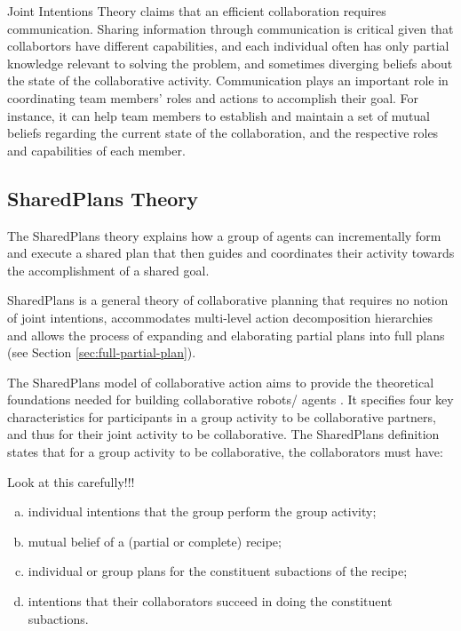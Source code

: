 \documentclass[11pt]{article}
\begin{document}
Joint Intentions Theory claims that an efficient collaboration requires
communication. Sharing information through communication is critical given that
collabortors have different capabilities, and each individual often has only
partial knowledge relevant to solving the problem, and sometimes diverging
beliefs about the state of the collaborative activity. Communication plays an
important role in coordinating team members' roles and actions to accomplish
their goal. For instance, it can help team members to establish and maintain a
set of mutual beliefs regarding the current state of the collaboration, and the
respective roles and capabilities of each member.

\subsection{SharedPlans Theory}
\label{sec:sharedplans}

The SharedPlans theory explains how a group of agents can incrementally form and
execute a shared plan that then guides and coordinates their activity towards
the accomplishment of a shared goal.

SharedPlans is a general theory of collaborative planning that requires no
notion of joint intentions, accommodates multi-level action decomposition
hierarchies and allows the process of expanding and elaborating partial plans
into full plans (see Section \ref{sec:full-partial-plan}).

The SharedPlans model of collaborative action \cite{grosz:planning-acting}
\cite{grosz:collaboration} \cite{grosz:plans-discourse} aims to provide the
theoretical foundations needed for building collaborative robots/ agents
\cite{grosz:collaborative-systems}. It specifies four key characteristics for
participants in a group activity to be collaborative partners, and thus for
their joint activity to be collaborative. The SharedPlans definition states that
for a group activity to be collaborative, the collaborators must have:

Look at this carefully!!!

\begin{enumerate}[a)]
  \item individual intentions that the group perform the group activity;
  \item mutual belief of a (partial or complete) recipe;
  \item individual or group plans for the constituent subactions of the recipe;
  \item intentions that their collaborators succeed in doing the constituent
  subactions.
\end{enumerate}
\end{document}
